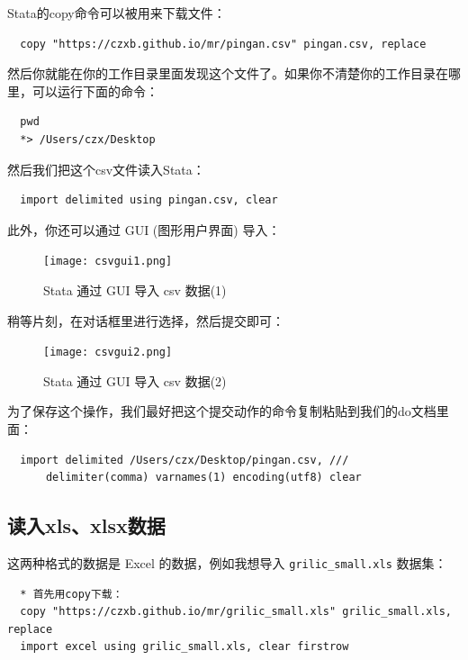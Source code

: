 \documentclass[cn,fancy,blue,11pt]{elegantbook}
\begin{document}
Stata的copy命令可以被用来下载文件：

\begin{lstlisting}
  copy "https://czxb.github.io/mr/pingan.csv" pingan.csv, replace
\end{lstlisting}

然后你就能在你的工作目录里面发现这个文件了。如果你不清楚你的工作目录在哪里，可以运行下面的命令：

\begin{lstlisting}
  pwd
  *> /Users/czx/Desktop
\end{lstlisting}

然后我们把这个csv文件读入Stata：

\begin{lstlisting}
  import delimited using pingan.csv, clear
\end{lstlisting}

此外，你还可以通过 GUI (图形用户界面) 导入：

\begin{figure}[htbp]
  \centering \texttt{[image: csvgui1.png]}
  \caption{Stata 通过 GUI 导入 csv 数据(1)}
  \label{fig:csvgui1}
\end{figure}

稍等片刻，在对话框里进行选择，然后提交即可：

\begin{figure}[htbp]
  \centering \texttt{[image: csvgui2.png]}
  \caption{Stata 通过 GUI 导入 csv 数据(2)}
  \label{fig:csvgui2}
\end{figure}

为了保存这个操作，我们最好把这个提交动作的命令复制粘贴到我们的do文档里面：

\begin{lstlisting}
  import delimited /Users/czx/Desktop/pingan.csv, ///
      delimiter(comma) varnames(1) encoding(utf8) clear
\end{lstlisting}

\subsection{读入xls、xlsx数据}

这两种格式的数据是 Excel 的数据，例如我想导入 \texttt{grilic\_small.xls} 数据集：

\begin{lstlisting}
  * 首先用copy下载：
  copy "https://czxb.github.io/mr/grilic_small.xls" grilic_small.xls, replace
  import excel using grilic_small.xls, clear firstrow
\end{lstlisting}
\end{document}
